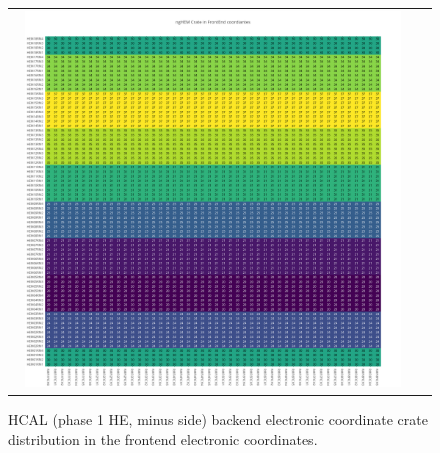 \clearpage
\begin{figure}[htb]
 \begin{center}
  \begin{tabular}{cc}
   \includegraphics[angle=0,width=0.95\textwidth]{figures/appendix/ngHEM_Crate_in_FrontEnd.png}
  \end{tabular}
  \caption{HCAL (phase 1 HE, minus side) backend electronic coordinate crate distribution in the frontend electronic coordinates.}
  \label{fig:lmapngHEMCrateFEC}
 \end{center}
\end{figure}


